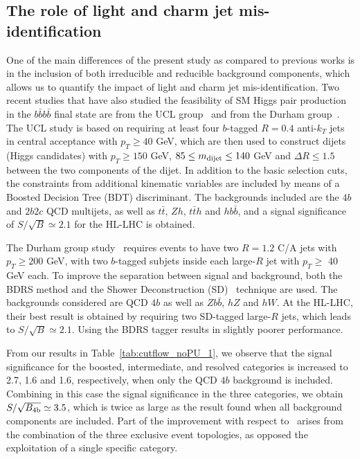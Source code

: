 \subsection{The role of light  and charm jet mis-identification}

One of the main differences of the present study as compared
to previous works is in the inclusion of both irreducible
and reducible background components, which allows us to
quantify
the impact of light and charm jet mis-identification. 
%
Two recent studies that have also studied the
feasibility of SM Higgs pair production in the $b\bar{b}b\bar{b}$
final state are from the UCL group~\cite{Wardrope:2014kya} and from
the
Durham group~\cite{deLima:2014dta}.
%
The UCL study is based
on requiring at least four $b$-tagged $R=0.4$ anti-$k_T$ jets
in central acceptance with $p_T \ge 40$ GeV, which are
then used to construct dijets (Higgs candidates) with
$p_T \ge 150$ GeV, $85 \le m_{\rm dijet} \le 140$ GeV
and $\Delta R \le 1.5$ between the two components
of the dijet.
%
In addition to the basic selection cuts, the constraints
from additional kinematic variables are included by means of a 
Boosted Decision Tree (BDT) discriminant.
%
The backgrounds included are the $4b$ and
$2b2c$ QCD multijets, as well as
$t\bar{t}$, $Zh$, $t\bar{t}h$ and $hb\bar{b}$,
and a signal significance of $S/\sqrt{B}\simeq 2.1$ for the HL-LHC
is obtained.

The Durham group study~\cite{deLima:2014dta} requires events
to have two $R=1.2$ C/A jets with $p_T\ge 200$ GeV, with
two $b$-tagged subjets inside each large-$R$ jet with
$p_T \ge$ 40 GeV each.
%
To improve the separation between
signal and background, both the BDRS
method and the Shower Deconstruction (SD)~\cite{Soper:2011cr,Soper:2012pb}
technique are used.
%
The backgrounds considered are QCD $4b$ as well as $Zb\bar{b}$, $hZ$ and
$hW$.
%
At the HL-LHC, their best result is obtained by requiring two
SD-tagged large-$R$ jets, which leads to $S/\sqrt{B}\simeq 2.1$. Using the BDRS tagger
results in slightly poorer performance.
 
 From our results in Table~\ref{tab:cutflow_noPU_1}, we observe
 that the signal significance for the boosted, intermediate,
 and resolved categories is increased to 2.7, 1.6 and 1.6, respectively,
 when only the QCD $4b$ background is included.
 Combining in this
 case the signal significance in the three categories,
 we
 obtain $S/\sqrt{B_{\rm 4b}}\simeq 3.5$, which is twice
 as large as the result found when
 all background components are included.
 Part of the improvement 
with respect to~\cite{deLima:2014dta,Wardrope:2014kya} arises
 from the combination of the three exclusive event topologies,
 as opposed the exploitation of a single specific category.

